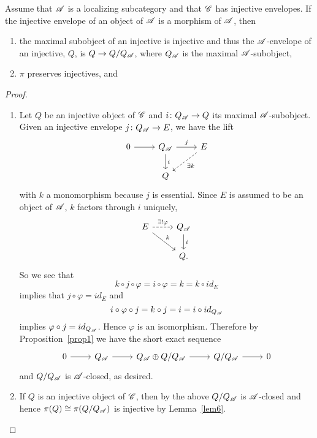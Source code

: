 \documentclass[dissertation.tex]{subfiles}
\begin{document}
\begin{cor}\label{cor2}
  Assume that $\mathscr{A}$ is a localizing subcategory and that $\mathscr{C}$ has injective envelopes.
  If the injective envelope of an object of $\mathscr{A}$ is a morphism of $\mathscr{A}$, then
  \begin{enumerate}
  \item\label{cor2.1}
    the maximal subobject of an injective is injective and thus the $\mathscr{A}$-envelope of an injective, $Q$, is $Q \rightarrow Q/Q_{\mathscr{A}}$, where $Q_{\mathscr{A}}$ is the maximal $\mathscr{A}$-subobject, 
  \item\label{cor2.2}
    $\pi$ preserves injectives, and
  \end{enumerate}
  \begin{proof}
    \begin{enumerate}
    \item
      Let $Q$ be an injective object of $\mathscr{C}$ and $i \colon Q_{\mathscr{A}} \rightarrow Q$ its maximal $\mathscr{A}$-subobject.
      Given an injective envelope $j \colon Q_{\mathscr{A}} \rightarrow E$, we have the lift
      $$\begin{tikzcd}
        0 \arrow{r} & Q_\A \arrow{d}{i} \arrow{r}{j} & E \arrow[dashed]{ld}{\exists k}\\
        & Q
      \end{tikzcd}$$
      with $k$ a monomorphism because $j$ is essential.
      Since $E$ is assumed to be an object of $\mathscr{A}$, $k$ factors through $i$ uniquely,
      $$\begin{tikzcd}
        E \arrow{rd}{k}\arrow[dashed]{r}{\exists !\varphi} & Q_\A\arrow{d}{i}\\
        & Q.
      \end{tikzcd}$$
      So we see that
      $$k \circ j \circ \varphi = i \circ \varphi = k = k \circ id_E$$
      implies that  $j \circ \varphi = id_E$
      and
      $$i \circ \varphi \circ j = k \circ j = i = i \circ id_{Q_{\mathscr{A}}}$$
      implies $\varphi \circ j = id_{Q_{\mathscr{A}}}$.
      Hence $\varphi$ is an isomorphism.
      Therefore by Proposition~\ref{prop1} we have the short exact sequence
      $$\begin{tikzcd}
        0 \arrow{r} & Q_\A \arrow{r} & Q_\A \oplus Q/Q_\A \arrow{r} & Q/Q_\A \arrow{r} & 0
      \end{tikzcd}$$
      and $Q/Q_{\mathscr{A}}$ is $\mathscr{A}$-closed, as desired.
    \item
      If $Q$ is an injective object of $\mathscr{C}$, then by the above $Q/Q_{\mathscr{A}}$ is $\mathscr{A}$-closed and hence $\pi(Q) \cong \pi(Q/Q_{\mathscr{A}})$ is injective by Lemma~\ref{lem6}.
      

\end{enumerate}
\end{proof}
\end{cor}
\end{document}
